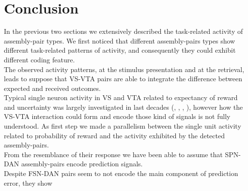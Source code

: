 \section{Conclusion}
In the previous two sections we extensively described the task-related activity of assembly-pair types. We first noticed that different assembly-pairs types show different task-related patterns of activity, and consequently they could exhibit different coding feature.\\The observed activity patterns, at the stimulus presentation and at the retrieval, leads to suppose that VS-VTA pairs are able to integrate the difference between expected and received outcomes.\\ Typical single neuron activity in VS and VTA related to expectancy of reward and uncertainty was largely investigated in last decades (\cite{Fiorillo}, \cite{Schultz}, \cite{Schultz1992}, \cite{Schultz1998}), however how the VS-VTA interaction could form and encode those kind of signals is not fully understood. As first step we made a parallelism between the single unit activity related to probability of reward and the activity exhibited by the detected assembly-pairs.\\From the resemblance of their response we have been able to assume that SPN-DAN assembly-pairs encode prediction signals.\\Despite FSN-DAN pairs seem to not encode the main component of prediction error, they show 
